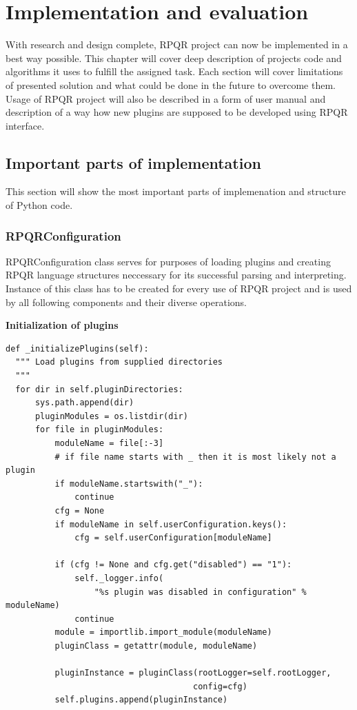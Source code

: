 \chapter{Implementation and evaluation}
With research and design complete, RPQR project can now be implemented in a best way possible.
This chapter will cover deep description of projects code and algorithms it uses to fulfill the
assigned task. Each section will cover limitations of presented solution and what could be done
in the future to overcome them. Usage of RPQR project will also be described in a form of user
manual and description of a way how new plugins are supposed to be developed using RPQR interface.

\section{Important parts of implementation}
This section will show the most important parts of implemenation and structure of Python code.

\subsection*{RPQRConfiguration}
RPQRConfiguration class serves for purposes of loading plugins and creating RPQR language structures
neccessary for its successful parsing and interpreting. Instance of this class has to be created for
every use of RPQR project and is used by all following components and their diverse operations.

\newpage

\textbf{Initialization of plugins}

\begin{lstlisting}
def _initializePlugins(self):
  """ Load plugins from supplied directories
  """
  for dir in self.pluginDirectories:
      sys.path.append(dir)
      pluginModules = os.listdir(dir)
      for file in pluginModules:
          moduleName = file[:-3]
          # if file name starts with _ then it is most likely not a plugin
          if moduleName.startswith("_"):
              continue
          cfg = None
          if moduleName in self.userConfiguration.keys():
              cfg = self.userConfiguration[moduleName]

          if (cfg != None and cfg.get("disabled") == "1"):
              self._logger.info(
                  "%s plugin was disabled in configuration" % moduleName)
              continue
          module = importlib.import_module(moduleName)
          pluginClass = getattr(module, moduleName)

          pluginInstance = pluginClass(rootLogger=self.rootLogger,
                                      config=cfg)
          self.plugins.append(pluginInstance)
\end{lstlisting}

